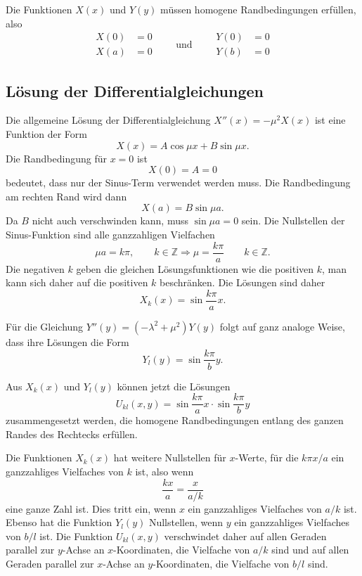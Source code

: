 Die Funktionen $X(x)$ und $Y(y)$ müssen homogene Randbedingungen
erfüllen, also
\[
\begin{aligned}
X(0) &= 0\\
X(a) &= 0
\end{aligned}
\qquad\text{und}\qquad
\begin{aligned}
Y(0) &= 0\\
Y(b) &= 0
\end{aligned}
\]

\subsection{Lösung der Differentialgleichungen}
Die allgemeine Lösung der Differentialgleichung $X''(x) = -\mu^2 X(x)$
ist eine Funktion der Form
\[
X(x) = A\cos\mu x + B\sin\mu x.
\]
Die Randbedingung für $x=0$ ist
\[
X(0) = A = 0
\]
bedeutet, dass nur der Sinus-Term verwendet werden muss.
Die Randbedingung am rechten Rand wird dann
\[
X(a) = B\sin\mu a.
\]
Da $B$ nicht auch verschwinden kann, muss $\sin\mu a=0$ sein.
Die Nullstellen der Sinus-Funktion sind alle ganzzahligen Vielfachen
\[
\mu a = k\pi,\qquad k\in\mathbb{Z}
\Rightarrow
\mu = \frac{k\pi}{a}\qquad k\in\mathbb{Z}.
\]
Die negativen $k$ geben die gleichen Lösungsfunktionen wie die positiven
$k$, man kann sich daher auf die positiven $k$ beschränken.
Die Lösungen sind daher
\[
X_k(x) = \sin \frac{k\pi}{a}x.
\]

Für die Gleichung $Y''(y)=(-\lambda^2 +\mu^2)Y(y)$ folgt auf ganz analoge
Weise, dass ihre Lösungen die Form
\[
Y_l(y)
=
\sin \frac{k\pi}{b}y.
\]

Aus $X_k(x)$ und $Y_l(y)$ können jetzt die Lösungen
\begin{equation}
U_{kl}(x,y) = \sin \frac{k\pi}{a} x\cdot \sin\frac{k\pi}{b}y
\label{buch:pde:rechteck:eqn:ukl}
\end{equation}
zusammengesetzt werden, die homogene Randbedingungen entlang
des ganzen Randes des Rechtecks erfüllen.

Die Funktionen $X_k(x)$ hat weitere Nullstellen für $x$-Werte, für
die $k\pi x/a$ ein ganzzahliges Vielfaches von $k$ ist, also  wenn
\[
\frac{kx}{a}
=
\frac{x}{a/k}
\]
eine ganze Zahl ist.
Dies tritt ein, wenn $x$ ein ganzzahliges Vielfaches von $a/k$ ist.
Ebenso hat die Funktion $Y_l(y)$ Nullstellen, wenn $y$ ein ganzzahliges
Vielfaches von $b/l$ ist.
Die Funktion $U_{kl}(x,y)$ verschwindet daher auf allen Geraden
parallel zur $y$-Achse an $x$-Koordinaten, die Vielfache von $a/k$ sind
und auf allen Geraden parallel zur $x$-Achse an $y$-Koordinaten, die
Vielfache von $b/l$ sind.

